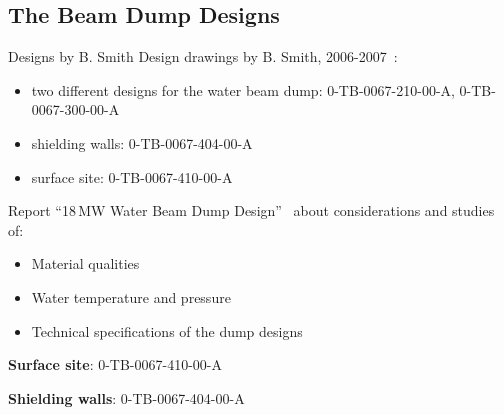 \documentclass[xcolor={dvipsnames}]{beamer}
\begin{document}

\subsection{The Beam Dump Designs}
\begin{frame}{Designs by B. Smith}
Design drawings by B. Smith, 2006-2007~\cite{Smith}:
\begin{itemize}
 \item two different designs for the water beam dump: 0-TB-0067-210-00-A, 0-TB-0067-300-00-A
 \item shielding walls: 0-TB-0067-404-00-A
 \item surface site: 0-TB-0067-410-00-A
\end{itemize}
Report ``18\,MW Water Beam Dump Design''~\cite{Smith_Report} about considerations and studies of:
\begin{itemize}
 \item Material qualities
 \item Water temperature and pressure
 \item Technical specifications of the dump designs
\end{itemize}
\end{frame}

\begin{frame}{\textbf{Surface site}: 0-TB-0067-410-00-A}
\centering
{}
\end{frame}
\begin{frame}{\textbf{Shielding walls}: 0-TB-0067-404-00-A}
\centering
{}
\end{frame}
\end{document}
